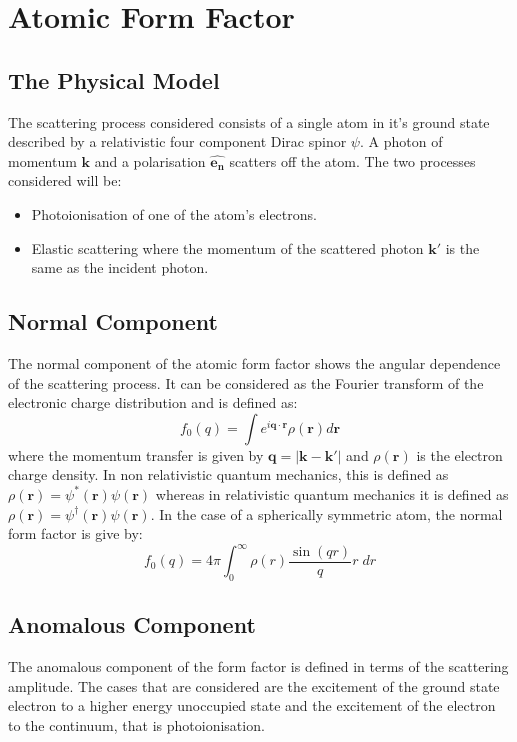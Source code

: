 \documentclass[a4paper,titlepage]{report}
\newcommand{\mb}[1]{\mathbf{#1}}
\begin{document}
\section{Atomic Form Factor}
	\subsection{The Physical Model}
	The scattering process considered consists of a single atom in it's
	ground state described by a relativistic four component Dirac spinor
	$\psi$. A photon of momentum $\mb{k}$ and a polarisation $\mb{\hat{e_n}}$
	scatters off the atom. The two processes considered will be:
	\begin{itemize}
		\item Photoionisation of one of the atom's electrons.
		\item Elastic scattering where the momentum of the scattered
			  photon $\mb{k'}$ is the same as the incident photon.
	\end{itemize}

	\subsection{Normal Component}
	The normal component of the atomic form factor shows the angular
	dependence of the scattering process. It can be considered as the
	Fourier transform of the electronic charge distribution and is
	defined as:
	\begin{equation} \label{eq:nff-general}
		f_0(q) = \int e^{i \mb{q} \cdot \mb{r} } \rho(\mb{r}) d\mb{r}
	\end{equation}
	where the momentum transfer is given by $\mb{q} = |\mb{k} - \mb{k'}|$ 
	and $\rho(\mb{r})$ is the electron charge density. In non
	relativistic quantum mechanics, this is defined as 
	$\rho(\mb{r}) = \psi^{*}(\mb{r}) \psi(\mb{r})$ whereas in
	relativistic quantum mechanics it is defined as 
	$\rho(\mb{r}) = \psi^{\dagger}(\mb{r}) \psi(\mb{r})$.
	In the case of a spherically symmetric atom, the normal form factor
	is give by:
	\begin{equation} \label{eq:nff-spherical}
		f_0(q) = 4 \pi \int_{0}^{\infty} \rho(r) \frac{\sin (qr)}{q} r \; dr
	\end{equation}

	\subsection{Anomalous Component}
	The anomalous component of the form factor is defined in terms of
	the scattering amplitude. The cases that are considered are the
	excitement of the ground state electron to a higher energy
	unoccupied state and the excitement of the electron to the
	continuum, that is photoionisation.
\end{document}
